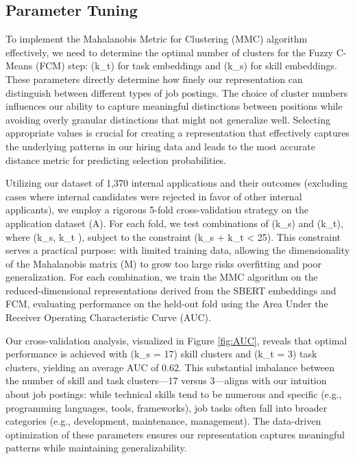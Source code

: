 \subsection{Parameter Tuning}

To implement the Mahalanobis Metric for Clustering (MMC) algorithm effectively, we need to determine the 
optimal number of clusters for the Fuzzy C-Means (FCM) step: (k_t) for task embeddings and (k_s) for skill 
embeddings. These parameters directly determine how finely our representation can distinguish between 
different types of job postings. The choice of cluster numbers influences our ability to capture meaningful 
distinctions between positions while avoiding overly granular distinctions that might not generalize well. 
Selecting appropriate values is crucial for creating a representation that effectively captures the 
underlying patterns in our hiring data and leads to the most accurate distance metric for predicting 
selection probabilities.

Utilizing our dataset of 1,370 internal applications and their outcomes (excluding cases where internal 
candidates were rejected in favor of other internal applicants), we employ a rigorous 5-fold cross-validation 
strategy on the application dataset (A). For each fold, we test combinations of (k_s) and (k_t), where 
(k_s, k_t ), subject to the constraint (k_s + k_t < 25). This constraint serves a 
practical purpose: with limited training data, allowing the dimensionality of the Mahalanobis matrix (M) 
to grow too large risks overfitting and poor generalization. For each combination, we train the MMC algorithm 
on the reduced-dimensional representations derived from the SBERT embeddings and FCM, evaluating performance 
on the held-out fold using the Area Under the Receiver Operating Characteristic Curve (AUC).

Our cross-validation analysis, visualized in Figure \ref{fig:AUC}, reveals that optimal performance 
is achieved with (k_s = 17) skill clusters and (k_t = 3) task clusters, yielding an average AUC of 0.62. 
This substantial imbalance between the number of skill and task clusters—17 versus 3—aligns with our intuition 
about job postings: while technical skills tend to be numerous and specific (e.g., programming languages, 
tools, frameworks), job tasks often fall into broader categories (e.g., development, maintenance, management). 
The data-driven optimization of these parameters ensures our representation captures meaningful patterns while 
maintaining generalizability.


